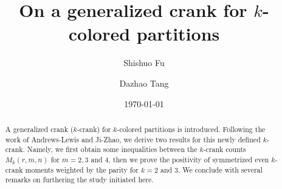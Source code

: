\documentclass[12pt]{amsart}
\numberwithin{equation}{section}
\theoremstyle{plain}
\theoremstyle{definition}
\begin{document}
\title[On a generalized crank]{On a generalized crank for $k$-colored partitions}

\author[S. Fu]{Shishuo Fu}
\address[Shishuo Fu]{College of Mathematics and Statistics, Chongqing University, Huxi Campus LD506, Chongqing 401331, P.R. China}


\author[D. Tang]{Dazhao Tang}

\address[Dazhao Tang]{College of Mathematics and Statistics, Chongqing University, Huxi Campus LD208, Chongqing 401331, P.R. China}

\date{\today}


\begin{abstract}
A generalized crank ($k$-crank) for $k$-colored partitions is introduced. Following the work of Andrews-Lewis and Ji-Zhao, we derive two results for this newly defined $k$-crank. Namely, we first obtain some inequalities between the $k$-crank counts $M_{k}(r,m,n)$ for $m=2,3$ and $4$, then we prove the positivity of symmetrized even $k$-crank moments weighted by the parity for $k=2$ and $3$. We conclude with several remarks on furthering the study initiated here.
\end{abstract}




\maketitle



\end{document}
